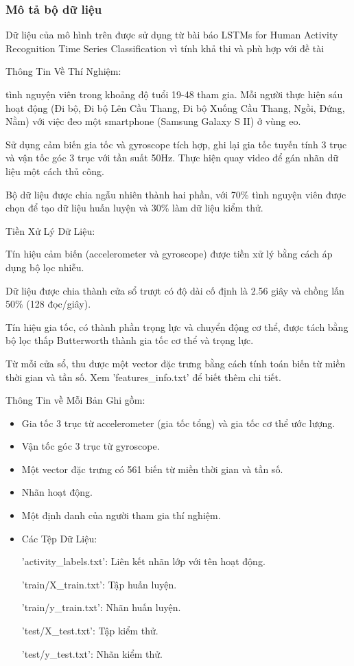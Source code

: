 \subsubsection{Mô tả bộ dữ liệu}
\indent Dữ liệu của mô hình trên được sử dụng từ bài báo LSTMs for Human Activity Recognition Time Series Classification vì tính khả thi và phù hợp với đề tài

\indent Thông Tin Về Thí Nghiệm: 

 tình nguyện viên trong khoảng độ tuổi 19-48 tham gia. Mỗi người thực hiện sáu hoạt động (Đi bộ, Đi bộ Lên Cầu Thang, Đi bộ Xuống Cầu Thang, Ngồi, Đứng, Nằm) với việc đeo một smartphone (Samsung Galaxy S II) ở vùng eo.

\indent Sử dụng cảm biến gia tốc và gyroscope tích hợp, ghi lại gia tốc tuyến tính 3 trục và vận tốc góc 3 trục với tần suất 50Hz.
Thực hiện quay video để gán nhãn dữ liệu một cách thủ công.

\indent Bộ dữ liệu được chia ngẫu nhiên thành hai phần, với 70\% tình nguyện viên được chọn để tạo dữ liệu huấn luyện và 30\% làm dữ liệu kiểm thử.

\indent Tiền Xử Lý Dữ Liệu:

\indent Tín hiệu cảm biến (accelerometer và gyroscope) được tiền xử lý bằng cách áp dụng bộ lọc nhiễu.

\indent Dữ liệu được chia thành cửa sổ trượt có độ dài cố định là 2.56 giây và chồng lấn 50\% (128 đọc/giây).

\indent Tín hiệu gia tốc, có thành phần trọng lực và chuyển động cơ thể, được tách bằng bộ lọc thấp Butterworth thành gia tốc cơ thể và trọng lực.

\indent Từ mỗi cửa sổ, thu được một vector đặc trưng bằng cách tính toán biến từ miền thời gian và tần số. Xem 'features\_info.txt' để biết thêm chi tiết.

\indent Thông Tin về Mỗi Bản Ghi gồm:
\begin{itemize}

\item Gia tốc 3 trục từ accelerometer (gia tốc tổng) và gia tốc cơ thể ước lượng.

\item Vận tốc góc 3 trục từ gyroscope.

\item Một vector đặc trưng có 561 biến từ miền thời gian và tần số.

\item Nhãn hoạt động.

\item Một định danh của người tham gia thí nghiệm.

\item Các Tệp Dữ Liệu:

'activity\_labels.txt': Liên kết nhãn lớp với tên hoạt động.

'train/X\_train.txt': Tập huấn luyện.

'train/y\_train.txt': Nhãn huấn luyện.

'test/X\_test.txt': Tập kiểm thử.

'test/y\_test.txt': Nhãn kiểm thử.

\end{itemize}

